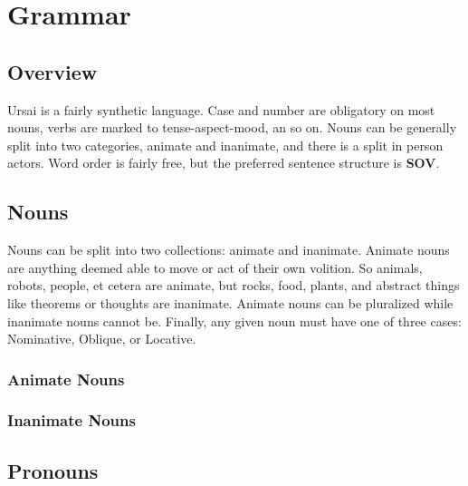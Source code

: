 \documentclass[11pt,letterpaper]{article}
\begin{document}
\pagebreak		
\section{Grammar}
	\subsection{Overview}
	Ursai is a fairly synthetic language.  Case and number are obligatory on most nouns, verbs are marked to tense-aspect-mood, an so on.  Nouns can be generally split into two categories, animate and inanimate, and there is a split in  person actors.  Word order is fairly free, but the preferred sentence structure is \textbf{SOV}.
	\subsection{Nouns}\label{nouns}
	Nouns can be split into two collections: animate and inanimate.  Animate nouns are anything deemed able to move or act of their own volition.  So animals, robots, people, et cetera are animate, but rocks, food, plants, and abstract things like theorems or thoughts are inanimate.  Animate nouns can be pluralized while inanimate nouns cannot be.  Finally, any given noun must have one of three cases: Nominative, Oblique, or Locative.
		\subsubsection{Animate Nouns}\label{animate}
		\subsubsection{Inanimate Nouns}\label{inanimate}
	\subsection{Pronouns}\label{pronouns}
\end{document}
